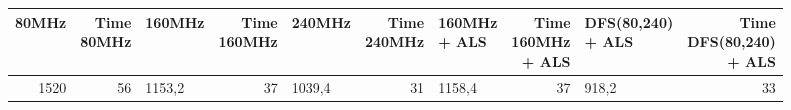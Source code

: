 \begin{tabular}{rrlrlrlrlr}
  \toprule
  80MHz & \specialcell{Time                                                        \\ 80MHz} & 160MHz &  \specialcell{Time \\ 160MHz} & 240MHz &  \specialcell{Time \\ 240MHz} & \specialcell{160MHz \\ + ALS} &  \specialcell{Time \\ 160MHz \\+ ALS} & \specialcell{DFS(80,240) \\+ ALS} &  \specialcell{Time \\ DFS(80,240) \\+ ALS} \\
  \midrule
  1520  & 56                & 1153,2 & 37 & 1039,4 & 31 & 1158,4 & 37 & 918,2 & 33 \\
  \bottomrule
\end{tabular}

